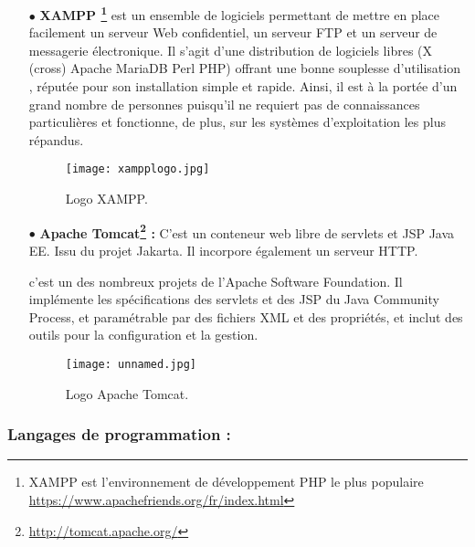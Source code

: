 \begin{itemize}
   \item[$\bullet$] \textbf{ XAMPP \footnote{XAMPP est l'environnement de développement PHP le plus populaire \url{https://www.apachefriends.org/fr/index.html} }} est un ensemble de logiciels permettant de mettre
    en place facilement un serveur Web
    confidentiel, un serveur FTP et un serveur de messagerie
    électronique. Il s’agit d’une distribution de logiciels libres (X
    (cross) Apache MariaDB Perl PHP) offrant une bonne
    souplesse d'utilisation , réputée pour son installation
    simple et rapide. Ainsi, il est à la portée d’un grand nombre de
    personnes puisqu'il ne requiert pas de connaissances
    particulières et fonctionne, de plus, sur les systèmes
    d'exploitation les plus répandus.
 \cite{wiki:XAMPP} 
    \begin{figure}[ht]
    	\centering
    	\texttt{[image: xampplogo.jpg]}
    	\caption{Logo XAMPP.}
    	\label{fig:xampp logo}
    \end{figure}
    \FloatBarrier
    
        \medskip
    
   \item[$\bullet$] \textbf{Apache Tomcat\footnote{\url{http://tomcat.apache.org/}} :} C'est un conteneur web libre de servlets et JSP Java EE. Issu du projet Jakarta. Il incorpore également un serveur HTTP\cite{wiki:tomcat}.
    
 c’est un des nombreux projets de l’Apache Software Foundation. Il implémente les spécifications des servlets et des JSP du Java Community Process, et paramétrable par des fichiers XML et des propriétés, et inclut des outils pour la configuration et la gestion.
 
  \begin{figure}[ht]
 	\centering
 	\texttt{[image: unnamed.jpg]}
 	\caption{Logo Apache Tomcat.}
 	\label{fig:Apache Tomcat}
 \end{figure}
 \FloatBarrier
\medskip
\end{itemize}


\subsubsection{Langages de programmation :}

